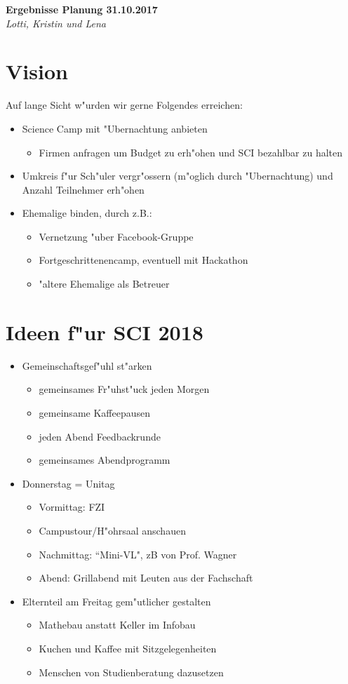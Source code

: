 \documentclass[12pt]{article}
\begin{document}
\begin{center}
\Large\textbf{Ergebnisse Planung 31.10.2017}\\
\large\textit{Lotti, Kristin und Lena}
\end{center}

\section{Vision}
Auf lange Sicht w"urden wir gerne Folgendes erreichen:
\begin{itemize}
\item Science Camp mit "Ubernachtung anbieten
\begin{itemize}
\item Firmen anfragen um Budget zu erh"ohen und SCI bezahlbar zu halten
\end{itemize}
\item Umkreis f"ur Sch"uler vergr"ossern (m"oglich durch "Ubernachtung) und Anzahl Teilnehmer erh"ohen
\item Ehemalige binden, durch z.B.:
\begin{itemize}
\item Vernetzung "uber Facebook-Gruppe
\item Fortgeschrittenencamp, eventuell mit Hackathon
\item "altere Ehemalige als Betreuer
\end{itemize}
\end{itemize}

\section{Ideen f"ur SCI 2018}
\begin{itemize}
\item Gemeinschaftsgef"uhl st"arken
\begin{itemize}
\item gemeinsames Fr"uhst"uck jeden Morgen
\item gemeinsame Kaffeepausen
\item jeden Abend Feedbackrunde
\item gemeinsames Abendprogramm
\end{itemize}
\item Donnerstag = Unitag
\begin{itemize}
\item Vormittag: FZI
\item Campustour/H"ohrsaal anschauen
\item Nachmittag: ``Mini-VL", zB von Prof. Wagner
\item Abend: Grillabend mit Leuten aus der Fachschaft
\end{itemize}
\item Elternteil am Freitag gem"utlicher gestalten
\begin{itemize}
\item Mathebau anstatt Keller im Infobau
\item Kuchen und Kaffee mit Sitzgelegenheiten
\item Menschen von Studienberatung dazusetzen
\end{itemize}
\end{itemize}
\end{document}
